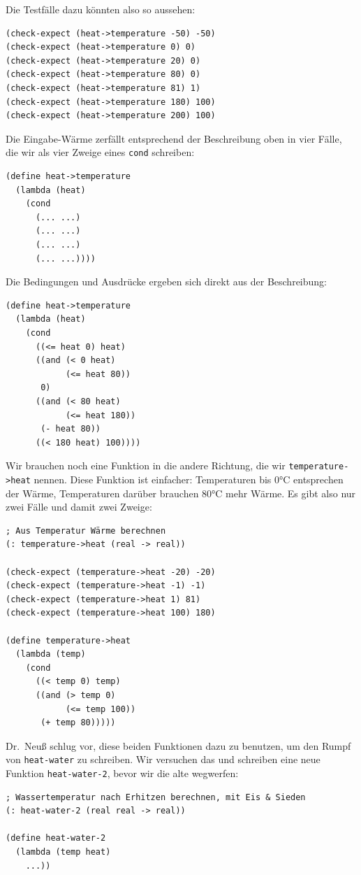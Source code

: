 Die Testfälle dazu könnten also so aussehen:
%
\begin{lstlisting}
(check-expect (heat->temperature -50) -50)
(check-expect (heat->temperature 0) 0)
(check-expect (heat->temperature 20) 0)
(check-expect (heat->temperature 80) 0)
(check-expect (heat->temperature 81) 1)
(check-expect (heat->temperature 180) 100)
(check-expect (heat->temperature 200) 100)                                            
\end{lstlisting}
%
Die Eingabe-Wärme zerfällt entsprechend der Beschreibung oben in vier
Fälle, die wir als vier Zweige eines \lstinline{cond} schreiben:
%
\begin{lstlisting}
(define heat->temperature
  (lambda (heat)
    (cond
      (... ...)
      (... ...)
      (... ...)
      (... ...))))
\end{lstlisting}
%
Die Bedingungen und Ausdrücke ergeben sich direkt aus der Beschreibung:
%
\begin{lstlisting}
(define heat->temperature
  (lambda (heat)
    (cond
      ((<= heat 0) heat)
      ((and (< 0 heat)
            (<= heat 80))
       0)
      ((and (< 80 heat)
            (<= heat 180))
       (- heat 80))
      ((< 180 heat) 100))))
\end{lstlisting}
%
Wir brauchen noch eine Funktion in die andere Richtung, die
wir \lstinline{temperature->heat} nennen. Diese Funktion ist einfacher:
Temperaturen bis 0\si{\degree}C entsprechen der Wärme, Temperaturen darüber
brauchen 80\si{\degree}C mehr Wärme.  Es gibt also nur zwei Fälle und damit zwei
Zweige:
%
\begin{lstlisting}
; Aus Temperatur Wärme berechnen
(: temperature->heat (real -> real))

(check-expect (temperature->heat -20) -20)
(check-expect (temperature->heat -1) -1)
(check-expect (temperature->heat 1) 81)
(check-expect (temperature->heat 100) 180)

(define temperature->heat
  (lambda (temp)
    (cond
      ((< temp 0) temp)
      ((and (> temp 0)
            (<= temp 100))
       (+ temp 80)))))
\end{lstlisting}
%
Dr.\ Neuß schlug vor, diese beiden Funktionen dazu zu benutzen, um den
Rumpf von \lstinline{heat-water} zu schreiben.  Wir versuchen das
und schreiben eine neue Funktion
\lstinline{heat-water-2}, bevor wir die alte wegwerfen:
%
\begin{lstlisting}
; Wassertemperatur nach Erhitzen berechnen, mit Eis & Sieden
(: heat-water-2 (real real -> real))

(define heat-water-2
  (lambda (temp heat)
    ...))
\end{lstlisting}
